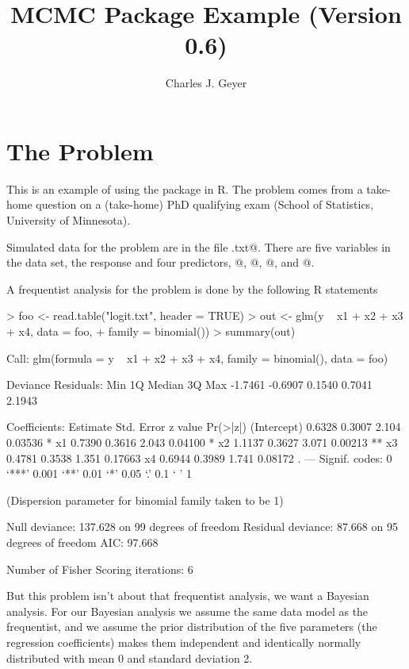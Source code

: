\documentclass{article}
\begin{document}
\title{MCMC Package Example (Version 0.6)}
\author{Charles J. Geyer}
\maketitle

\section{The Problem}

This is an example of using the \verb@mcmc@ package in R.  The problem comes
from a take-home question on a (take-home) PhD qualifying exam
(School of Statistics, University of Minnesota).

Simulated data for the problem are in the file \verb@logit.txt@.
There are five variables in the data set, the response \verb@y@
and four predictors, @, @, @, and @.

A frequentist analysis for the problem is done by the following R statements
\begin{Schunk}
\begin{Sinput}
> foo <- read.table("logit.txt", header = TRUE)
> out <- glm(y ~ x1 + x2 + x3 + x4, data = foo, 
+     family = binomial())
> summary(out)
\end{Sinput}
\begin{Soutput}
Call:
glm(formula = y ~ x1 + x2 + x3 + x4, family = binomial(), data = foo)

Deviance Residuals: 
    Min       1Q   Median       3Q      Max  
-1.7461  -0.6907   0.1540   0.7041   2.1943  

Coefficients:
            Estimate Std. Error z value Pr(>|z|)   
(Intercept)   0.6328     0.3007   2.104  0.03536 * 
x1            0.7390     0.3616   2.043  0.04100 * 
x2            1.1137     0.3627   3.071  0.00213 **
x3            0.4781     0.3538   1.351  0.17663   
x4            0.6944     0.3989   1.741  0.08172 . 
---
Signif. codes:  0 ‘***’ 0.001 ‘**’ 0.01 ‘*’ 0.05 ‘.’ 0.1 ‘ ’ 1 

(Dispersion parameter for binomial family taken to be 1)

    Null deviance: 137.628  on 99  degrees of freedom
Residual deviance:  87.668  on 95  degrees of freedom
AIC: 97.668

Number of Fisher Scoring iterations: 6
\end{Soutput}
\end{Schunk}

But this problem isn't about that frequentist analysis, we want a Bayesian
analysis.  For our Bayesian analysis we assume the same data model as the
frequentist, and we assume the prior distribution of the five parameters
(the regression coefficients) makes them independent and identically
normally distributed with mean 0 and standard deviation 2.
\end{document}
